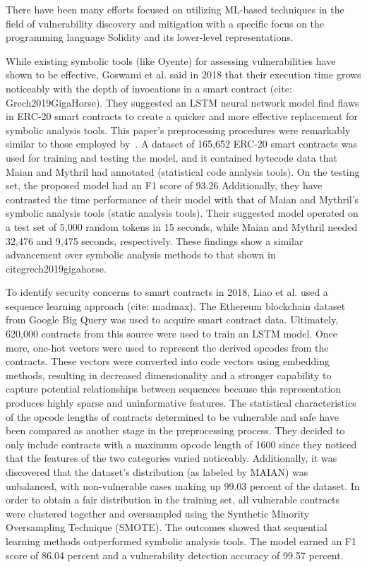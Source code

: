 There have been many efforts focused on utilizing ML-based techniques in the field of vulnerability discovery and mitigation with a specific focus on the programming language Solidity and
its lower-level representations.

While existing symbolic tools (like Oyente) for assessing vulnerabilities have shown to be effective, Goswami et al. said in 2018 that their execution time grows noticeably with the depth of invocations in a smart contract (cite: Grech2019GigaHorse).
They suggested an LSTM neural network model find flaws in ERC-20 smart contracts to create a quicker and more effective replacement for symbolic analysis tools.
This paper's preprocessing procedures were remarkably similar to those employed by~\cite{madmax}.
A dataset of 165,652 ERC-20 smart contracts was used for training and testing the model, and it contained bytecode data that Maian and Mythril had annotated (statistical code analysis tools).
On the testing set, the proposed model had an F1 score of 93.26%
Additionally, they have contrasted the time performance of their model with that of Maian and Mythril's symbolic analysis tools (static analysis tools).
Their suggested model operated on a test set of 5,000 random tokens in 15 seconds, while Maian and Mythril needed 32,476 and 9,475 seconds, respectively.
These findings show a similar advancement over symbolic analysis methods to that shown in citegrech2019gigahorse.

To identify security concerns to smart contracts in 2018, Liao et al. used a sequence learning approach (cite: madmax).
The Ethereum blockchain dataset from Google Big Query was used to acquire smart contract data.
Ultimately, 620,000 contracts from this source were used to train an LSTM model. Once more, one-hot vectors were used to represent the derived opcodes from the contracts.
These vectors were converted into code vectors using embedding methods, resulting in decreased dimensionality and a stronger capability to capture potential relationships between sequences because this representation produces highly sparse and uninformative features.
The statistical characteristics of the opcode lengths of contracts determined to be vulnerable and safe have been compared as another stage in the preprocessing process.
They decided to only include contracts with a maximum opcode length of 1600 since they noticed that the features of the two categories varied noticeably.
Additionally, it was discovered that the dataset's distribution (as labeled by MAIAN) was unbalanced, with non-vulnerable cases making up 99.03 percent of the dataset.
In order to obtain a fair distribution in the training set, all vulnerable contracts were clustered together and oversampled using the Synthetic Minority Oversampling Technique (SMOTE).
The outcomes showed that sequential learning methods outperformed symbolic analysis tools.
The model earned an F1 score of 86.04 percent and a vulnerability detection accuracy of 99.57 percent.

